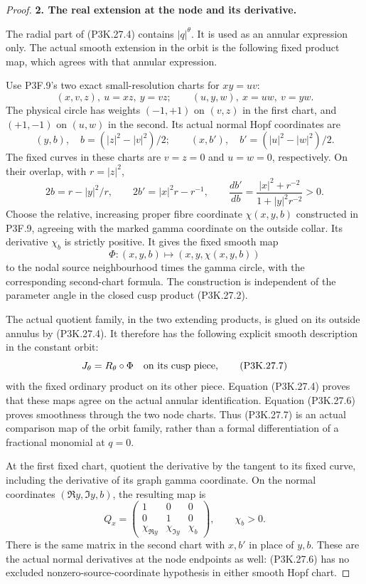 \begin{proof}
\par\medskip\noindent\textbf{2. The real extension at the node and its derivative.}\enspace

The radial part of (P3K.27.4) contains \(|q|^\theta\).
It is used as an annular expression only. The actual smooth
extension in the orbit is the following fixed product map,
which agrees with that annular expression.

Use P3F.9's two exact small-resolution charts for
\(xy=uv\):
\[
 (x,v,z),\ u=xz,\ y=vz;\qquad
 (u,y,w),\ x=uw,\ v=yw.
\]
The physical circle has weights \((-1,+1)\) on \((v,z)\)
in the first chart, and \((+1,-1)\) on \((u,w)\) in the
second. Its actual normal Hopf coordinates are
\[
 (y,b),\quad b=(|z|^2-|v|^2)/2;
 \qquad
 (x,b'),\quad b'=(|u|^2-|w|^2)/2.
                                                        \tag{P3K.27.5}
\]
The fixed curves in these charts are \(v=z=0\) and
\(u=w=0\), respectively. On their overlap, with \(r=|z|^2\),
\[
 2b=r-|y|^2/r,\qquad
 2b'=|x|^2r-r^{-1},\qquad
 \frac{db'}{db}
       =\frac{|x|^2+r^{-2}}{1+|y|^2r^{-2}}>0.
                                                        \tag{P3K.27.6}
\]
Choose the relative, increasing proper fibre coordinate
\(\chi(x,y,b)\) constructed in P3F.9, agreeing with the
marked gamma coordinate on the outside collar. Its
derivative \(\chi_b\) is strictly positive. It gives the
fixed smooth map
\[
         \Phi:(x,y,b)\longmapsto(x,y,\chi(x,y,b))
\]
to the nodal source neighbourhood times the gamma circle,
with the corresponding second-chart formula.
The construction is independent of the parameter angle
in the closed cusp product (P3K.27.2).

The actual quotient family, in the two extending products,
is glued on its outside annulus by (P3K.27.4). It therefore
has the following explicit smooth description in the
constant orbit:
\[
          J_\theta=R_\theta\circ\Phi
             \quad\hbox{on its cusp piece},             \tag{P3K.27.7}
\]
with the fixed ordinary product on its other piece.
Equation (P3K.27.4) proves that these maps agree on the
actual annular identification. Equation (P3K.27.6) proves
smoothness through the two node charts. Thus (P3K.27.7)
is an actual comparison map of the orbit family, rather
than a formal differentiation of a fractional monomial
at \(q=0\).

At the first fixed chart, quotient the derivative by the
tangent to its fixed curve, including the derivative of
its graph gamma coordinate. On the normal coordinates
\((\Re y,\Im y,b)\), the resulting map is
\[
 Q_x=
 \begin{pmatrix}
 1&0&0\\
 0&1&0\\
 \chi_{\Re y}&\chi_{\Im y}&\chi_b
 \end{pmatrix},\qquad \chi_b>0.                         \tag{P3K.27.8}
\]
There is the same matrix in the second chart with \(x,b'\)
in place of \(y,b\). These are the actual normal derivatives
at the node endpoints as well: (P3K.27.6) has no excluded
nonzero-source-coordinate hypothesis in either smooth
Hopf chart.


\end{proof}
